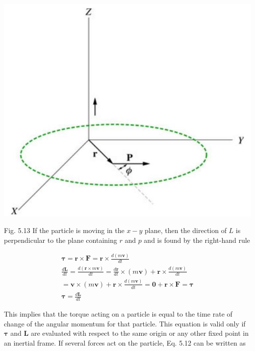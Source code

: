 \documentclass[10pt]{article}
\begin{document}
\begin{center}
\includegraphics[max width=\textwidth]{2024_09_13_db1f357d2aad0a03eb2eg-091(1)}
\end{center}

Fig. 5.13 If the particle is moving in the $x-y$ plane, then the direction of $L$ is perpendicular to the plane containing $r$ and $p$ and is found by the right-hand rule


\begin{gather*}
\boldsymbol{\tau}=\mathbf{r} \times \mathbf{F}=\mathbf{r} \times \frac{d(m \mathbf{v})}{d t} \\
\frac{d \mathbf{L}}{d t}=\frac{d(\mathbf{r} \times m \mathbf{v})}{d t}=\frac{d \mathbf{r}}{d t} \times(m \mathbf{v})+\mathbf{r} \times \frac{d(m \mathbf{v})}{d t} \\
=\mathbf{v} \times(m \mathbf{v})+\mathbf{r} \times \frac{d(m \mathbf{v})}{d t}=\mathbf{0}+\mathbf{r} \times \mathbf{F}=\boldsymbol{\tau} \\
\boldsymbol{\tau}=\frac{d \mathbf{L}}{d t} \tag{5.12}
\end{gather*}


This implies that the torque acting on a particle is equal to the time rate of change of the angular momentum for that particle. This equation is valid only if $\boldsymbol{\tau}$ and $\mathbf{L}$ are evaluated with respect to the same origin or any other fixed point in an inertial frame. If several forces act on the particle, Eq. 5.12 can be written as
\end{document}
